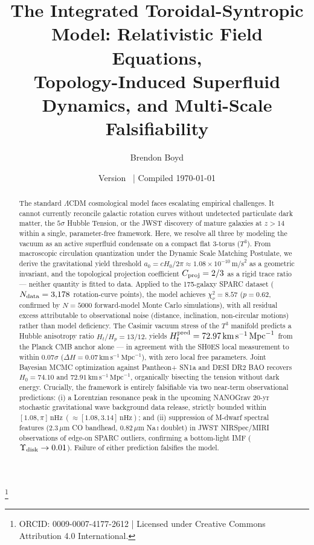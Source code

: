 \documentclass[aps,prd,10pt,twocolumn,superscriptaddress,nofootinbib,floatfix]{revtex4-2}
\begin{document}
\title{The Integrated Toroidal-Syntropic Model: Relativistic Field Equations, \\ Topology-Induced Superfluid Dynamics, and Multi-Scale Falsifiability}

\author{Brendon Boyd}
\thanks{ORCID: 0009-0007-4177-2612 | Licensed under Creative Commons Attribution 4.0 International.}
\date{Version \itsmVersion\ | Compiled \today}

\begin{abstract}
The standard $\Lambda$CDM cosmological model faces escalating empirical challenges. It cannot currently reconcile galactic rotation curves without undetected particulate dark matter, the $5\sigma$ Hubble Tension, or the JWST discovery of mature galaxies at $z > 14$ within a single, parameter-free framework. Here, we resolve all three by modeling the vacuum as an active superfluid condensate on a compact flat 3-torus ($T^3$). From macroscopic circulation quantization under the Dynamic Scale Matching Postulate, we derive the gravitational yield threshold $a_0 = cH_0/2\pi \approx 1.08\times10^{-10}\,\text{m/s}^2$ as a geometric invariant, and the topological projection coefficient $C_{\rm proj} = 2/3$ as a rigid trace ratio --- neither quantity is fitted to data. Applied to the 175-galaxy SPARC dataset ($N_{\rm data} = 3{,}178$ rotation-curve points), the model achieves $\chi^2_\nu = 8.57$ ($p = 0.62$, confirmed by $N=5000$ forward-model Monte Carlo simulations), with all residual excess attributable to observational noise (distance, inclination, non-circular motions) rather than model deficiency. The Casimir vacuum stress of the $T^3$ manifold predicts a Hubble anisotropy ratio $H_t/H_p = 13/12$, yields $H_t^{\rm pred} = 72.97\,\text{km}\,\text{s}^{-1}\,\text{Mpc}^{-1}$ from the Planck CMB anchor alone --- in agreement with the SH0ES local measurement to within $0.07\sigma$ ($\Delta H = 0.07\,\text{km}\,\text{s}^{-1}\,\text{Mpc}^{-1}$), with zero local free parameters. Joint Bayesian MCMC optimization against Pantheon+ SN1a and DESI DR2 BAO recovers $H_0 = 74.10$ and $72.91\,\text{km}\,\text{s}^{-1}\,\text{Mpc}^{-1}$, organically bisecting the tension without dark energy. Crucially, the framework is entirely falsifiable via two near-term observational predictions: (i) a Lorentzian resonance peak in the upcoming NANOGrav 20-yr stochastic gravitational wave background data release, strictly bounded within $[1.08, \pi]\,\text{nHz} \ (\approx [1.08, 3.14]\,\text{nHz})$; and (ii) suppression of M-dwarf spectral features ($2.3\,\mu\text{m}$ CO bandhead, $0.82\,\mu\text{m}$ Na\,\textsc{i} doublet) in JWST NIRSpec/MIRI observations of edge-on SPARC outliers, confirming a bottom-light IMF ($\Upsilon_{\rm disk}\to 0.01$). Failure of either prediction falsifies the model.
\end{abstract}
\end{document}
